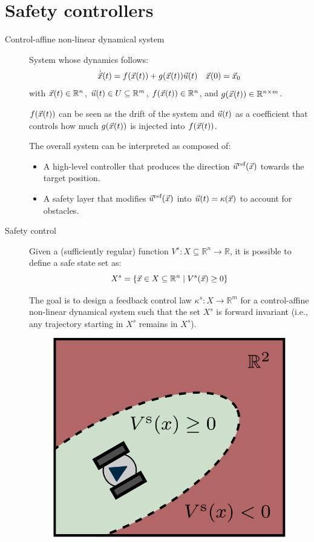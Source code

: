 \chapter{Safety controllers}


\begin{description}
    \item[Control-affine non-linear dynamical system] 
        System whose dynamics follows:
        \[
            \dot{{\vec{x}}}(t) = f({\vec{x}}(t)) + g({\vec{x}}(t)) {\vec{u}}(t) \quad {\vec{x}}(0) = {\vec{x}}_0
        \]
        with ${\vec{x}}(t) \in \mathbb{R}^n$, ${\vec{u}}(t) \in U \subseteq \mathbb{R}^m$, $f({\vec{x}}(t)) \in \mathbb{R}^n$, and $g({\vec{x}}(t)) \in \mathbb{R}^{n \times m}$.

        $f({\vec{x}}(t))$ can be seen as the drift of the system and ${\vec{u}}(t)$ as a coefficient that controls how much $g({\vec{x}}(t))$ is injected into $f({\vec{x}}(t))$.

        The overall system can be interpreted as composed of:
        \begin{itemize}
            \item A high-level controller that produces the direction ${\vec{u}}^\text{ref}({\vec{x}})$ towards the target position.
            \item A safety layer that modifies ${\vec{u}}^\text{ref}({\vec{x}})$ into ${\vec{u}}(t) = \kappa({\vec{x}})$ to account for obstacles.
        \end{itemize}

    \item[Safety control] 
        Given a (sufficiently regular) function $V^s: X \subseteq \mathbb{R}^n \rightarrow \mathbb{R}$, it is possible to define a safe state set as:
        \[
            X^s = \{ {\vec{x}} \in X \subseteq \mathbb{R}^n \mid V^s({\vec{x}}) \geq 0 \}
        \]

        The goal is to design a feedback control law $\kappa^s: X \rightarrow \mathbb{R}^m$ for a control-affine non-linear dynamical system such that the set $X^s$ is forward invariant (i.e., any trajectory starting in $X^s$ remains in $X^s$).

        \begin{figure}[H]
            \centering
            \includegraphics[width=0.25\linewidth]{./img/safety_control.png}
        \end{figure}


\end{description}
